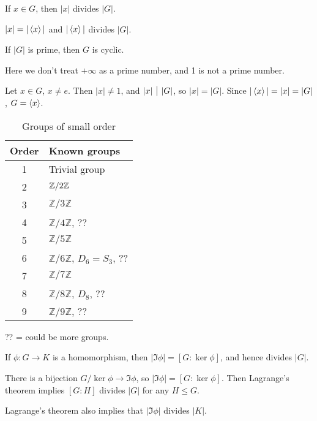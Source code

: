 \begin{corr}
	If $x\in G$, then $|x|$ divides $|G|$.
\end{corr}
\begin{pf}
$|x|=|\left\langle x \right\rangle|$ and $|\left\langle x \right\rangle|$ divides $|G|$.
\end{pf}
\begin{prop}
If $|G|$ is prime, then $G$ is cyclic.
\end{prop}
\begin{pf}
Here we don't treat $+\infty$ as a prime number, and 1 is not a prime number.

Let $x\in G$, $x\ne e$. Then $|x|\ne 1$, and $|x| \midd |G|$, so $|x|=|G|$. Since $|\left\langle x \right\rangle|=|x| = |G|$, $G=\left\langle x \right\rangle$.
\end{pf}

\begin{table}[h]
\centering
\begin{tabular}{c | l}
	Order & Known groups \\\hline 
	1 & Trivial group \\
	2 & $\mathbb Z/{2}\mathbb Z$\\
3 & $\mathbb Z/ 3 \mathbb Z$\\
4 & $\mathbb Z/ 4 \mathbb Z$, ??\\
5 & $\mathbb Z/ 5 \mathbb Z$\\
6 & $\mathbb Z/ 6 \mathbb Z$, $D_6=S_3$, ??\\
7 & $\mathbb Z/ 7 \mathbb Z$\\
8 & $\mathbb Z/ 8 \mathbb Z$, $D_8$, ?? \\
9 & $\mathbb Z/ 9 \mathbb Z$, ??\\
\end{tabular}

\caption{Groups of small order}
\end{table}
?? = could be more groups.

\begin{corr}
If $\phi:G\to K$ is a homomorphism, then $|\Im \phi| = [G:\ker \phi]$, and hence divides $|G|$.
\end{corr}

\begin{pf}
There is a bijection $G/\ker\phi\to \Im\phi$, so $|\Im\phi| = [G:\ker\phi]$. Then Lagrange's theorem implies $[G:H]$ divides $|G|$ for any $H\le G$.
\end{pf}
\begin{note}
Lagrange's theorem also implies that $|\Im\phi|$ divides $|K|$.
\end{note}


